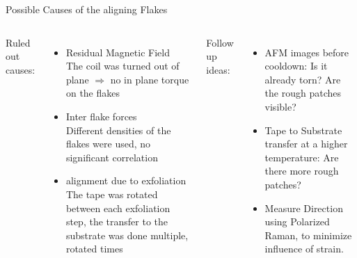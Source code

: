 \documentclass[
	10pt,
]{beamer}
\begin{document}
\begin{frame}{Possible Causes of the aligning Flakes}
	\begin{columns}
		Ruled out causes:
		\begin{itemize}
			\item Residual Magnetic Field\\ The coil was turned out of plane $\Rightarrow$ no in plane torque on the flakes
			\item Inter flake forces\\ Different densities of the flakes were used, no significant correlation
			\item alignment due to exfoliation\\ The tape was rotated between each exfoliation step, the transfer to the substrate was done multiple, rotated times
		\end{itemize}

		Follow up ideas:
		\begin{itemize}
			\item AFM images before cooldown: Is it already torn? Are the rough patches visible?
			\item Tape to Substrate transfer at a higher temperature: Are there more rough patches?
			\item Measure Direction using Polarized Raman, to minimize influence of strain. 
		\end{itemize}
	\end{columns}
\end{frame}
\end{document}
